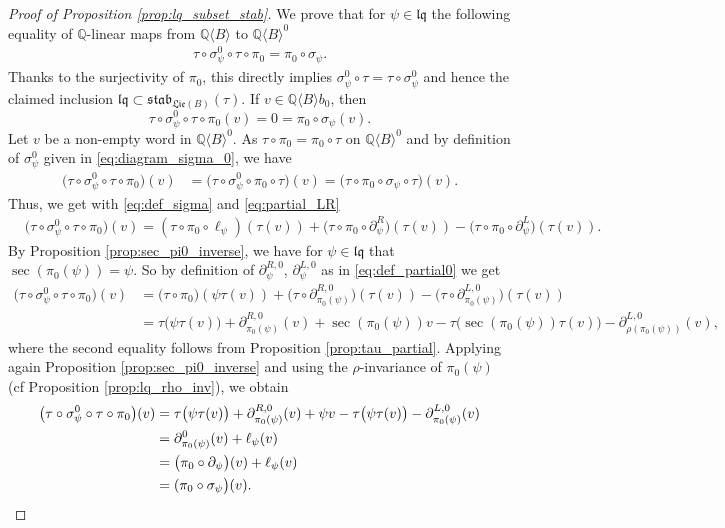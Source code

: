 \documentclass[11pt, a4paper]{amsart}
\numberwithin{equation}{section}
\theoremstyle{definition}
\newcommand{\Q}{\mathbb{Q}}
\newcommand{\QB}{\Q\langle B\rangle}
\newcommand{\lqq}{\mathfrak{lq}}
\newcommand{\Lie}{\mathfrak{Lie}}
\newcommand{\stab}{\mathfrak{stab}}
\begin{document}
\begin{proof}[Proof of Proposition \ref{prop:lq_subset_stab}]
We prove that for $\psi \in \lqq$ the following equality of $\Q$-linear maps from $\QB$ to $\QB^0$
\begin{align*} 
\tau \circ \sigma_\psi^0 \circ \tau \circ \pi_0 = \pi_0 \circ \sigma_\psi.
\end{align*}
Thanks to the surjectivity of $\pi_0$, this directly implies $\sigma_\psi^0 \circ \tau = \tau \circ \sigma_\psi^0$ and hence the claimed inclusion $\lqq \subset \stab_{\Lie(B)}(\tau)$. If $v \in \QB b_0$, then
\[
    \tau \circ \sigma_\psi^0 \circ \tau \circ \pi_0(v) = 0 = \pi_0 \circ \sigma_\psi(v).
\]
Let $v$ be a non-empty word in $\QB^0$. As $\tau\circ \pi_0=\pi_0\circ \tau$ on $\QB^0$ and by definition of $\sigma_\psi ^0$ given in \eqref{eq:diagram_sigma_0}, we have
\begin{align*}
\big(\tau\circ \sigma_\psi^0\circ\tau\circ\pi_0\big)(v)&=\big(\tau\circ \sigma_\psi^0\circ\pi_0\circ\tau\big)(v)=\big(\tau\circ\pi_0\circ\sigma_\psi\circ\tau\big)(v).
\end{align*}
Thus, we get with \eqref{eq:def_sigma} and \eqref{eq:partial_LR}
\begin{align*}
&\big(\tau\circ \sigma_\psi^0\circ\tau\circ\pi_0\big)(v)=(\tau\circ\pi_0\circ\ell_\psi)(\tau(v))+\big(\tau\circ\pi_0\circ \partial_\psi^R\big)(\tau(v))-\big(\tau\circ \pi_0\circ \partial_\psi^L\big)(\tau(v)).
\end{align*}
By Proposition \ref{prop:sec_pi0_inverse}, we have for $\psi\in\lqq$ that $\sec(\pi_0(\psi))=\psi$. So by definition of $\partial_\psi^{R,0}$, $\partial_\psi^{L,0}$ as in \eqref{eq:def_partial0} we get
\begin{align*}
\big(\tau\circ \sigma_\psi^0\circ\tau\circ\pi_0\big)(v)&=\big(\tau\circ\pi_0\big)(\psi\tau(v))+\big(\tau\circ\partial_{\pi_0(\psi)}^{R,0}\big)(\tau(v))-\big(\tau\circ \partial_{\pi_0(\psi)}^{L,0}\big)(\tau(v))\\
&=\tau\big(\psi\tau(v)\big)+\partial_{\pi_0(\psi)}^{R,0}(v)+\sec(\pi_0(\psi))v-\tau\big(\sec(\pi_0(\psi))\tau(v)\big)-\partial_{\rho(\pi_0(\psi))}^{L,0}(v),
\end{align*}
where the second equality follows from Proposition \ref{prop:tau_partial}. Applying again Proposition \ref{prop:sec_pi0_inverse} and using the $\rho$-invariance of $\pi_0(\psi)$ (cf Proposition \ref{prop:lq_rho_inv}), we obtain
\begin{align*}
\big(\tau\circ \sigma_\psi^0\circ\tau\circ\pi_0\big)(v)&=\tau\big(\psi\tau(v)\big)+\partial_{\pi_0(\psi)}^{R,0}(v)+\psi v-\tau\big(\psi\tau(v)\big)-\partial_{\pi_0(\psi)}^{L,0}(v) \\
&=\partial_{\pi_0(\psi)}^0(v)+\ell_\psi(v)\\
&=\big(\pi_0\circ \partial_\psi\big)(v)+\ell_{\psi}(v)\\
&=(\pi_0\circ\sigma_\psi\big)(v). \qedhere
\end{align*}
\end{proof}
\end{document}
